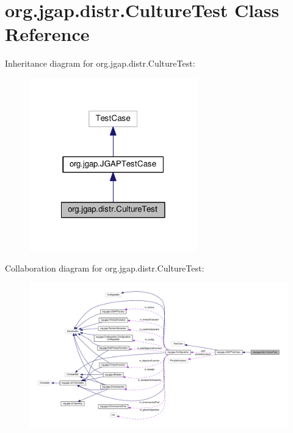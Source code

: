 \hypertarget{classorg_1_1jgap_1_1distr_1_1_culture_test}{\section{org.\-jgap.\-distr.\-Culture\-Test Class Reference}
\label{classorg_1_1jgap_1_1distr_1_1_culture_test}
}


Inheritance diagram for org.\-jgap.\-distr.\-Culture\-Test\-:
\nopagebreak
\begin{figure}[H]
\begin{center}
\leavevmode
\includegraphics[width=206pt]{classorg_1_1jgap_1_1distr_1_1_culture_test__inherit__graph}
\end{center}
\end{figure}


Collaboration diagram for org.\-jgap.\-distr.\-Culture\-Test\-:
\nopagebreak
\begin{figure}[H]
\begin{center}
\leavevmode
\includegraphics[width=350pt]{classorg_1_1jgap_1_1distr_1_1_culture_test__coll__graph}
\end{center}
\end{figure}
